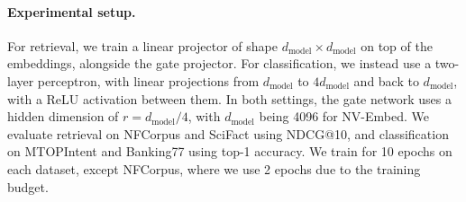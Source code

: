 \paragraph{Experimental setup.}
For retrieval, we train a linear projector of shape
$d_{\text{model}}\times d_{\text{model}}$ on top of the embeddings, alongside
the gate projector. For classification, we instead use a two-layer perceptron,
with linear projections from $d_{\text{model}}$ to $4d_{\text{model}}$ and back to $d_{\text{model}}$,
with a ReLU activation between them. In both settings, the gate network uses
a hidden dimension of $r=d_{\text{model}} / 4$, with $d_{\text{model}}$ being
4096 for NV-Embed.
We evaluate retrieval on NFCorpus and SciFact using NDCG@10, and classification
on MTOPIntent and Banking77 using top-1 accuracy. We train for 10 epochs on
each dataset, except NFCorpus, where we use 2 epochs due to the training budget.

\begin{table}[!htbp]
\centering
\caption{Performance of NV-Embed representations on classification and retrieval
tasks. Scores are percentages. $k$ is the number of coordinates retained at
inference; dense representations use all $d_{\text{model}}$ coordinates.
The dense baseline uses NV-Embed with a projector fine-tuned on each task
and retains all coordinates. The best score in each column is bold and the second-highest
distinct score is underlined.}
\label{tab:zon-embedding_results}
\small
\setlength{\tabcolsep}{3pt}
\end{table}


